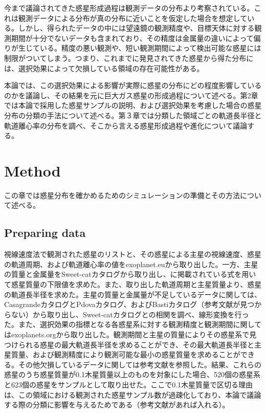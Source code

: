 \documentclass[twocolumn, dvipdfmx]{aastex62}
\begin{document}
\begin{CJK*}{UTF8}{min}
今まで議論されてきた惑星形成過程は観測データの分布より考察されている。これは観測データによる分布が真の分布に近いことを仮定した場合を想定している。しかし、得られたデータの中には望遠鏡の観測精度や、目標天体に対する観測期間が十分でないデータも含まれており、その精度は金属量の違いによって偏りが生じている。精度の悪い観測や、短い観測期間によって検出可能な惑星には制限がついてしまう。つまり、これまでに発見されてきた惑星から得た分布には、選択効果によって欠損している領域の存在可能性がある。

本論では、この選択効果による影響が実際に惑星の分布にどの程度影響しているのかを議論し、その結果を元に巨大ガス惑星の形成過程について述べる。第2章では本論で採用した惑星サンプルの説明、および選択効果を考慮した場合の惑星分布の分類の手法について述べる。第３章では分類した領域ごとの軌道長半径と軌道離心率の分布を調べ、そこから言える惑星形成過程や進化について議論する。


\section{Method} \label{sec:method}

この章では惑星分布を確かめるためのシミュレーションの準備とその方法について述べる。


\subsection{Preparing data} \label{subsec:prepare}

視線速度法で観測された惑星のリストと、その惑星による主星の視線速度、惑星の軌道周期、および軌道離心率の値をexoplanet.euから取り出した。一方、主星の質量と金属量をSweet-catカタログから取り出し、\cite{2008ApJ...677.1324T}に掲載されている式を用いて惑星質量の下限値を求めた。また、取り出した軌道周期と主星質量より、惑星の軌道長半径を求めた。主星の質量と金属量が不足しているデータに関しては、Casagrandeカタログ\citep{2011A&A...530A.138C}とPdovaカタログ\citep{2011MNRAS.416..727C}、およびBastiカタログ（参考文献が見つからない）から取り出し、Sweet-catカタログとの相関を調べ、線形変換を行った。また、選択効果の指標となる各惑星系に対する観測精度と観測期間に関してはexoplanets.orgから取り出した。観測期間と主星の質量によりその惑星系で見つけられる惑星の最大軌道長半径を求めることができ、その最大軌道長半径と主星質量、および観測精度により観測可能な最小の惑星質量を求めることができる。その他欠損しているデータに関しては参考文献を参照した。結果、これらの惑星のうち惑星質量が0.1木星質量以上のものを対象にした場合、520個の惑星系と623個の惑星をサンプルとして取り出せた。ここで0.1木星質量で区切る理由は、この領域における観測された惑星サンプル数が過疎化しており、本論で議論する際の分類に影響を与えるためである（参考文献があれば入れる）。



\end{CJK*}
\end{document}
